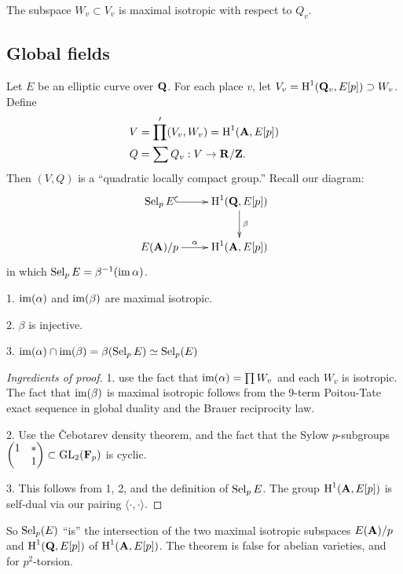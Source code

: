\begin{theo}[O'Neil]
The subspace $W_v\subset V_v$ is maximal isotropic with respect to $Q_v$. 
\end{theo}





\subsection{Global fields}

Let $E$ be an elliptic curve over $\mathbf{Q}$. For each place $v$, let 
$V_v=\operatorname{H}^1(\mathbf{Q}_v,E[p]) \supset W_v$. Define 
\begin{align*}
  V &= \prod' (V_v,W_v) = \operatorname{H}^1(\mathbf{A},E[p]) \\
  Q &= \sum Q_v :V\to \mathbf{R}/\mathbf{Z} .
\end{align*}
Then $(V,Q)$ is a ``quadratic locally compact group.'' Recall our diagram: 
\[\xymatrix{
  \selmer_p E \ar@{^{(}->}[r] 
    & \h^1(\dQ,E[p]) \ar[d]^-\beta \\
  E(\dA)/p \ar[r]^-\alpha 
    & \h^1(\dA,E[p]) 
}\]
in which $\operatorname{Sel}_p E = \beta^{-1}(\operatorname{im}\alpha)$. 

\begin{theo}
1. $\operatorname{im}(\alpha)$ and $\operatorname{im}(\beta)$ are maximal isotropic. 

2. $\beta$ is injective. 

3. $\operatorname{im}(\alpha)\cap \operatorname{im}(\beta) = \beta(\operatorname{Sel}_p E)\simeq \operatorname{Sel}_p(E)$
\end{theo}
\begin{proof}[Ingredients of proof]
1. use the fact that $\operatorname{im}(\alpha) = \prod W_v$ and each $W_v$ is 
isotropic. The fact that $\operatorname{im}(\beta)$ is maximal isotropic follows from the 
9-term Poitou-Tate exact sequence in global duality and the Brauer reciprocity 
law. 

2. Use the \v Cebotarev density theorem, and the fact that the Sylow 
$p$-subgroups 
$\begin{pmatrix} 1 & \ast \\ & 1 \end{pmatrix}\subset \operatorname{GL}_2(\mathbf{F}_p)$ 
is cyclic. 

3. This follows from 1, 2, and the definition of $\operatorname{Sel}_p E$. The 
group $\operatorname{H}^1(\mathbf{A},E[p])$ is self-dual via our pairing 
$\langle \cdot,\cdot\rangle$. 
\end{proof}

So $\operatorname{Sel}_p(E)$ ``is'' the intersection of the two maximal isotropic subspaces 
$E(\mathbf{A})/p$ and $\operatorname{H}^1(\mathbf{Q},E[p])$ of $\operatorname{H}^1(\mathbf{A},E[p])$. The theorem is false for 
abelian varieties, and for $p^2$-torsion. 





